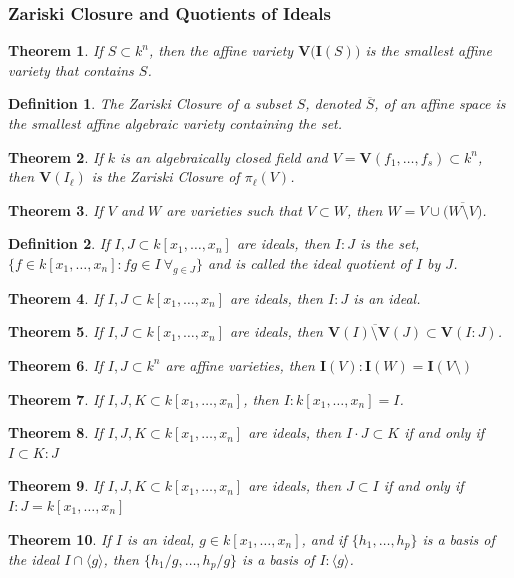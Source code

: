 \documentclass[oneside]{book}
\theoremstyle{mystyle}
\newtheorem{theorem}{Theorem}[section]
\newtheorem{definition}{Definition}[section]
\begin{document}
\subsubsection{Zariski Closure and Quotients of Ideals}
\begin{theorem}
If $S\subset k^n$, then the affine variety $\mathbf{V}\big(\textbf{I}(S)\big)$ is the smallest affine variety that contains $S$.
\end{theorem}
\begin{definition}
The Zariski Closure of a subset $S$, denoted $\overline{S}$, of an affine space is the smallest affine algebraic variety containing the set. 
\end{definition}
\begin{theorem}
If $k$ is an algebraically closed field and $V = \mathbf{V}(f_1,\hdots, f_s)\subset k^n$, then $\mathbf{V}(I_{\ell})$ is the Zariski Closure of $\pi_{\ell}(V)$.
\end{theorem}
\begin{theorem}
If $V$ and $W$ are varieties such that $V\subset W$, then $W = V\cup \overline{\big(W\setminus V\big)}$.
\end{theorem}
\begin{definition}
If $I,J\subset k[x_1,\hdots ,x_n]$ are ideals, then $I:J$ is the set, $\{f\in k[x_1,\hdots ,x_n]: fg \in I\ \forall_{g\in J}\}$ and is called the ideal quotient of $I$ by $J$.
\end{definition}
\begin{theorem}
If $I,J\subset k[x_1,\hdots ,x_n]$ are ideals, then $I:J$ is an ideal.
\end{theorem}
\begin{theorem}
If $I,J\subset k[x_1,\hdots ,x_n]$ are ideals, then $\overline{\mathbf{V}(I)\setminus \mathbf{V}(J)} \subset \mathbf{V}(I:J)$.
\end{theorem}
\begin{theorem}
If $I,J\subset k^n$ are affine varieties, then $\textbf{I}(V): \textbf{I}(W) = \textbf{I}(V\setminus)$
\end{theorem}
\begin{theorem}
If $I,J, K \subset k[x_1,\hdots ,x_n]$, then $I:k[x_1,\hdots ,x_n] = I$.
\end{theorem}
\begin{theorem}
If $I,J,K \subset k[x_1,\hdots ,x_n]$ are ideals, then $I\cdot J \subset K$ if and only if $I \subset K:J$
\end{theorem}
\begin{theorem}
If $I,J,K \subset k[x_1,\hdots ,x_n]$ are ideals, then $J\subset I$ if and only if $I:J = k[x_1,\hdots ,x_n]$
\end{theorem}
\begin{theorem}
If $I$ is an ideal, $g\in k[x_1,\hdots ,x_n]$, and if $\{h_1,\hdots, h_p\}$ is a basis of the ideal $I\cap \langle g \rangle$, then $\{h_1/g,\hdots, h_p/g\}$ is a basis of $I:\langle g\rangle$.
\end{theorem}
\end{document}

